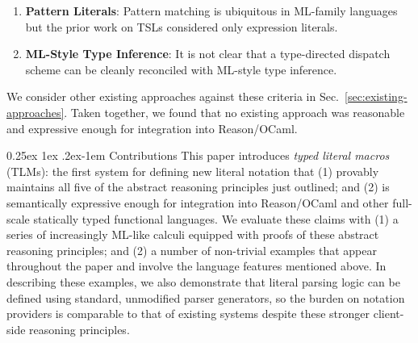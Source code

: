 \documentclass[acmsmall,review,anonymous]{acmart}\settopmatter{printfolios=true,printccs=false,printacmref=false}
\makeatletter
\renewcommand{\paragraph}{%
  \@startsection{paragraph}{4}%
  {\z@}{0.25ex \@plus 1ex \@minus .2ex}{-1em}%
  {\normalfont\normalsize\bfseries}%
}
\makeatother
\begin{document}
\begin{enumerate}[leftmargin=12px]
\begin{enumerate}[leftmargin=15px,nolistsep,noitemsep]
  \item \textbf{Pattern Literals}: Pattern matching is ubiquitous in ML-family languages but the prior work on TSLs considered only expression literals. %
  \item \textbf{ML-Style Type Inference}: It is not clear that a type-directed dispatch scheme can be cleanly  reconciled with ML-style type inference.
\end{enumerate}
\end{enumerate}


We consider other existing approaches against these criteria in Sec.~\ref{sec:existing-approaches}. Taken together, we found that no existing approach was reasonable and expressive enough for integration into Reason/OCaml.

\paragraph{Contributions} This paper introduces \emph{typed literal macros} (TLMs): the first system for defining new literal notation that (1) provably maintains all five of the abstract reasoning principles just outlined; and (2) is semantically expressive enough for integration into Reason/OCaml and other full-scale statically typed functional languages. We evaluate these claims with (1) a series of increasingly ML-like calculi equipped with proofs of these abstract reasoning principles; and (2) a number of non-trivial examples that appear throughout the paper and involve the language features mentioned above. In describing these examples, we also demonstrate that literal parsing logic can be defined using standard, unmodified parser generators, so the burden on notation providers is comparable to that of existing systems despite these stronger client-side reasoning principles. %


\end{document}
